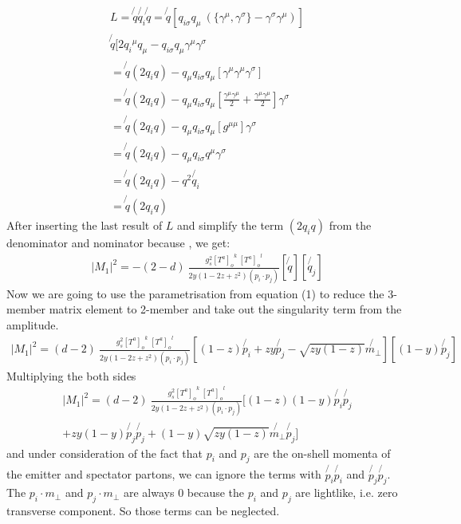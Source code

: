 \begin{equation}
\begin{split}
L=\not{q} \not{q_i} \not{q} =\not{q}[{q_{i\sigma}} q_{\mu} \: (\lbrace{\gamma^{\mu}}, {\gamma^{\sigma}}\rbrace - {\gamma^{\sigma}}{\gamma^{\mu}})]\\ 
\not{q}[2{q_{i}}^{\mu} q_{\mu} - {q_{i\sigma}}q_{\mu}{\gamma^{\mu}}{\gamma^{\sigma}}\\
=\not{q} (2q_i q)-q_{\mu}{q_{i\sigma}}q_{\mu}[{\gamma^{\mu}}{\gamma^{\mu}}{\gamma^{\sigma}}]\\
=\not{q} (2q_i q)-q_{\mu}{q_{i\sigma}}q_{\mu}[\frac{{\gamma^{\mu}}{\gamma^{\mu}}}{2} +\frac{{\gamma^{\mu}}{\gamma^{\mu}}}{2}]{\gamma^{\sigma}}\\
=\not{q} (2q_i q)-q_{\mu}{q_{i\sigma}}q_{\mu}[g^{{\mu}{\mu}}]{\gamma^{\sigma}}\\
=\not{q} (2q_i q)-q_{\mu}{q_{i\sigma}}q^{\mu}{\gamma^{\sigma}}\\
=\not{q} (2q_i q)-q^2 \not{q_i}\\
=\not{q} (2q_i q)
\end{split}
\end{equation}
After inserting the last result of $ L $ and simplify the term $ (2q_i q) $ from the denominator and nominator because , we get:
\begin{equation}
\begin{split}
|M_1|^2=-(2-d)\:\frac{g_s^2  {[T^a]_{o}}^k \: {[T^a]_o}^l }{2y(1-2z+z^2)(p_i \cdot p_j)}
[\not{q}]
[\not{q_j}]
\end{split}
\end{equation}
Now we are going to use the parametrisation from equation (1) to reduce the 3-member matrix element to 2-member and take out the singularity term from the amplitude.
\begin{equation}
\begin{split}
|M_1|^2=(d-2)\:\frac{g_s^2  {[T^a]_{o}}^k \: {[T^a]_o}^l }{2y(1-2z+z^2)(p_i \cdot p_j)}
[(1-z) \not{p_i}+zy \not{p_j} - \sqrt{zy(1-z)} \not{{m}_{\bot}}]
[(1-y) \not{p_j}]
\end{split}
\end{equation}
Multiplying the both sides 
\begin{equation}
\begin{split}
|M_1|^2=(d-2)\:\frac{g_s^2  {[T^a]_{o}}^k \: {[T^a]_o}^l }{2y(1-2z+z^2)(p_i \cdot p_j)}
[(1-z)(1-y) \not{p_i}\not{p_j} \\
+zy(1-y) \not{p_j}\not{p_j} + (1-y)\sqrt{zy(1-z)} \not{{m}_{\bot}}\not{p_j}]
\end{split}
\end{equation}
and under consideration of the fact that $ p_i $ and $ p_j $ are the on-shell momenta of the emitter and spectator partons, we can ignore the terms with $ \not{p_i} \not{p_i} $ and $ \not{p_j} \not{p_j} $.
The $ {p_i} \cdot  {m}_{\bot} $ and $ {p_j} \cdot  {m}_{\bot} $ are always $ 0 $ because the $ p_i $ and $ p_j $ are lightlike, i.e. zero transverse component. So those terms can be neglected.


